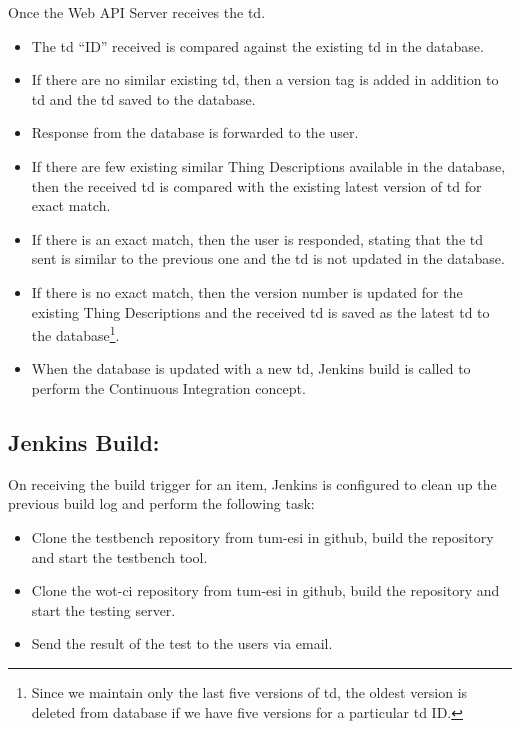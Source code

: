 \documentclass[conference]{IEEEtran}
\theoremstyle{definition}
\begin{document}
Once the Web API Server receives the \ac{td}.
\begin{itemize}
  \item The \ac{td} “ID” received is compared against the existing \ac{td} in the database.
  \item If there are no similar existing \ac{td}, 
    \subitem then a version tag is added in addition to \ac{td} and the \ac{td} saved to the database.
  \item Response from the database is forwarded to the user.
  \item If there are few existing similar Thing Descriptions available in the database, 
    \subitem then the received \ac{td} is compared with the existing latest version of \ac{td} for exact match.
  \item If there is an exact match,
    \subitem then the user is responded, stating that the \ac{td} sent is similar to the previous one and the \ac{td} is not updated in the database.
  \item If there is no exact match,
    \subitem then the version number is updated for the existing Thing Descriptions and the received \ac{td} is saved as the latest \ac{td} to the database\footnote{Since we maintain only the last five versions of \ac{td}, the oldest version is deleted from database if we have five versions for a particular \ac{td} ID.}.
  \item When the database is updated with a new \ac{td}, Jenkins build is called to perform the Continuous Integration concept.
\end{itemize}

\subsection{Jenkins Build:}
  
On receiving the build trigger for an item, Jenkins is configured to clean up the previous build log and perform the following task:

\begin{itemize}
\item Clone the testbench repository from tum-esi in github, build the repository and start the testbench tool.
\item Clone the wot-ci repository from tum-esi in github, build the repository and start the testing server.
\item Send the result of the test to the users via email.
\end{itemize}
\end{document}
